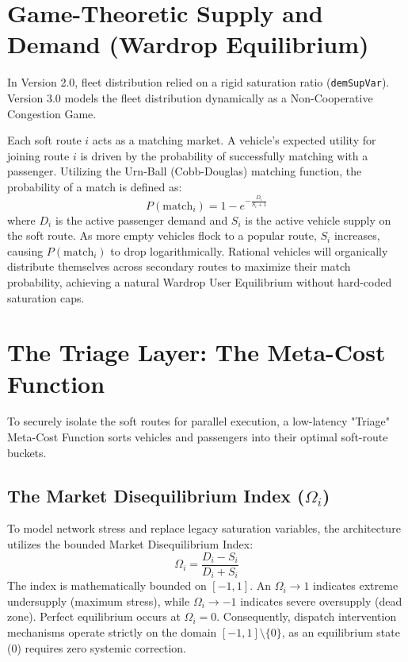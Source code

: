 \documentclass[12pt,a4paper]{article}
\begin{document}
\section{Game-Theoretic Supply and Demand (Wardrop Equilibrium)}
In Version 2.0, fleet distribution relied on a rigid saturation ratio (\texttt{demSupVar}). Version 3.0 models the fleet distribution dynamically as a Non-Cooperative Congestion Game. 

Each soft route $i$ acts as a matching market. A vehicle's expected utility for joining route $i$ is driven by the probability of successfully matching with a passenger. Utilizing the Urn-Ball (Cobb-Douglas) matching function, the probability of a match is defined as:
\begin{equation}
    P(\text{match}_i) = 1 - e^{-\frac{D_i}{S_i + 1}}
\end{equation}
where $D_i$ is the active passenger demand and $S_i$ is the active vehicle supply on the soft route. As more empty vehicles flock to a popular route, $S_i$ increases, causing $P(\text{match}_i)$ to drop logarithmically. Rational vehicles will organically distribute themselves across secondary routes to maximize their match probability, achieving a natural Wardrop User Equilibrium without hard-coded saturation caps.

\section{The Triage Layer: The Meta-Cost Function}
To securely isolate the soft routes for parallel execution, a low-latency "Triage" Meta-Cost Function sorts vehicles and passengers into their optimal soft-route buckets.

\subsection[Market Disequilibrium Index]{The Market Disequilibrium Index ($\Omega_i$)}
To model network stress and replace legacy saturation variables, the architecture utilizes the bounded Market Disequilibrium Index:
\begin{equation}
    \Omega_i = \frac{D_i - S_i}{D_i + S_i}
\end{equation}
The index is mathematically bounded on $[-1, 1]$. An $\Omega_i \to 1$ indicates extreme undersupply (maximum stress), while $\Omega_i \to -1$ indicates severe oversupply (dead zone). Perfect equilibrium occurs at $\Omega_i = 0$. Consequently, dispatch intervention mechanisms operate strictly on the domain $[-1, 1] \setminus \{0\}$, as an equilibrium state ($0$) requires zero systemic correction.
\end{document}
